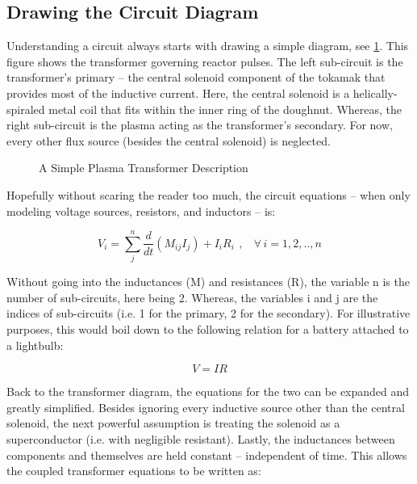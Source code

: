 \subsection{Drawing the Circuit Diagram}

Understanding a circuit always starts with drawing a simple diagram, see \cref{fig:circuit_diagram}. This figure shows the transformer governing reactor pulses. The left sub-circuit is the transformer's primary -- the central solenoid component of the tokamak that provides most of the inductive current. Here, the central solenoid is a helically-spiraled metal coil that fits within the inner ring of the doughnut. Whereas, the right sub-circuit is the plasma acting as the transformer's secondary. For now, every other flux source (besides the central solenoid) is neglected.

\begin{figure}[h!]
\centering

\caption{A Simple Plasma Transformer Description}
\label{fig:circuit_diagram}
\end{figure}

Hopefully without scaring the reader too much, the circuit equations -- when only modeling voltage sources, resistors, and inductors -- is:

\begin{equation}
	V_i = \sum_j^n \frac{d}{dt} \left( M_{ij} I_j \right) + I_i R_i \ \, , \ \ \ \ \forall \, i = 1,2,..,n
\end{equation}

Without going into the inductances (M) and resistances (R), the variable n is the number of sub-circuits, here being 2. Whereas, the variables i and j are the indices of sub-circuits (i.e. 1 for the primary, 2 for the secondary). For illustrative purposes, this would boil down to the following relation for a battery attached to a lightbulb:

\begin{equation}
	V = I R
\end{equation}

Back to the transformer diagram, the equations for the two can be expanded and greatly simplified. Besides ignoring every inductive source other than the central solenoid, the next powerful assumption is treating the solenoid as a superconductor (i.e. with negligible resistant). Lastly, the inductances between components and themselves are held constant -- independent of time. This allows the coupled transformer equations to be written as:

